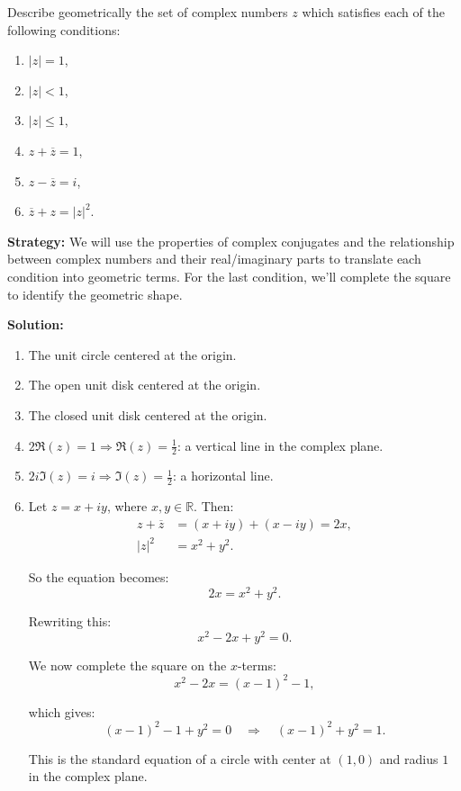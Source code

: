 \begin{problembox}
\begin{problemstatement}
Describe geometrically the set of complex numbers \( z \) which satisfies each of the following conditions:
\begin{enumerate}[label=\alph*)]
\item \( |z| = 1 \),
\item \( |z| < 1 \),
\item \( |z| \leq 1 \),
\item \( z + \overline{z} = 1 \),
\item \( z - \overline{z} = i \),
\item \( \overline{z} + z = |z|^2 \).
\end{enumerate}
\end{problemstatement}
\end{problembox}

\noindent\textbf{Strategy:} We will use the properties of complex conjugates and the relationship between complex numbers and their real/imaginary parts to translate each condition into geometric terms. For the last condition, we'll complete the square to identify the geometric shape.

\bigskip\noindent\textbf{Solution:}
\begin{enumerate}[label=\alph*)]
\item The unit circle centered at the origin.
\item The open unit disk centered at the origin.
\item The closed unit disk centered at the origin.
\item \( 2 \Re(z) = 1 \Rightarrow \Re(z) = \frac{1}{2} \): a vertical line in the complex plane.
\item \( 2i \Im(z) = i \Rightarrow \Im(z) = \frac{1}{2} \): a horizontal line.
\item Let \( z = x + iy \), where \( x, y \in \mathbb{R} \). Then:
\begin{align*}
z + \overline{z} &= (x + iy) + (x - iy) = 2x, \\
|z|^2 &= x^2 + y^2.
\end{align*}

So the equation becomes:
\[
2x = x^2 + y^2.
\]

Rewriting this:
\[
x^2 - 2x + y^2 = 0.
\]

We now complete the square on the \( x \)-terms:
\[
x^2 - 2x = (x - 1)^2 - 1,
\]

which gives:
\[
(x - 1)^2 - 1 + y^2 = 0 \quad \Rightarrow \quad (x - 1)^2 + y^2 = 1.
\]

This is the standard equation of a circle with center at \( (1, 0) \) and radius \( 1 \) in the complex plane.

\end{enumerate}

